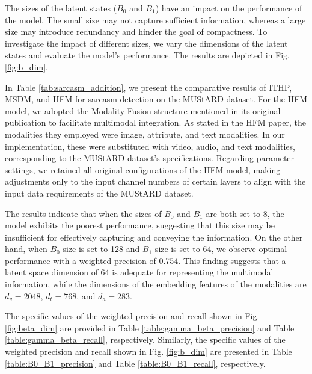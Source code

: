 \documentclass{article} %
\begin{document}
The sizes of the latent states ($B_0$ and $B_1$) have an impact on the performance of the model. The small size may not capture sufficient information, whereas a large size may introduce redundancy and hinder the goal of compactness. To investigate the impact of different sizes, we vary the dimensions of the latent states and evaluate the model's performance. The results are depicted in Fig. \ref{fig:b_dim}.

In Table \ref{tab:sarcasm_addition}, we present the comparative results of ITHP, MSDM, and HFM for sarcasm detection on the MUStARD dataset. For the HFM model, we adopted the Modality Fusion structure mentioned in its original publication to facilitate multimodal integration. As stated in the HFM paper, the modalities they employed were image, attribute, and text modalities. In our implementation, these were substituted with video, audio, and text modalities, corresponding to the MUStARD dataset's specifications. Regarding parameter settings, we retained all original configurations of the HFM model, making adjustments only to the input channel numbers of certain layers to align with the input data requirements of the MUStARD dataset. 



The results indicate that when the sizes of $B_0$ and $B_1$ are both set to 8, the model exhibits the poorest performance, suggesting that this size may be insufficient for effectively capturing and conveying the information. On the other hand, when $B_0$ size is set to 128 and $B_1$ size is set to 64, we observe optimal performance with a weighted precision of 0.754. This finding suggests that a latent space dimension of 64 is adequate for representing the multimodal information, while the dimensions of the embedding features of the modalities are $d_v=2048$, $d_t=768$, and $d_a=283$. 

The specific values of the weighted precision and recall shown in Fig. \ref{fig:beta_dim} are provided in Table \ref{table:gamma_beta_precision} and Table \ref{table:gamma_beta_recall}, respectively. Similarly, the specific values of the weighted precision and recall shown in Fig. \ref{fig:b_dim} are presented in Table \ref{table:B0_B1_precision} and Table \ref{table:B0_B1_recall}, respectively.
\FloatBarrier







\end{document}

